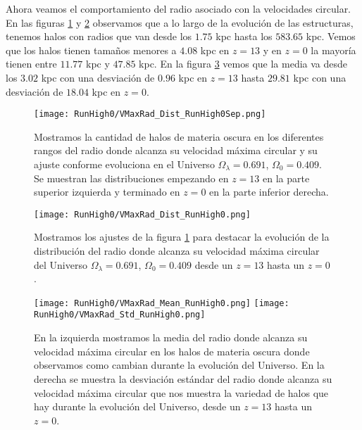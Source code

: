 Ahora veamos el comportamiento del radio asociado con la velocidades circular. En las figuras \ref{fig:High0-VMaxRadDistSep} y \ref{fig:High0-VMaxRadDist} observamos que a lo largo de la evolución de las estructuras, tenemos halos con radios que van desde los $1.75$ kpc hasta los $583.65$ kpc. Vemos que los halos tienen tamaños menores a $4.08$ kpc en $z=13$ y en $z=0$ la mayoría tienen entre $11.77$ kpc y $47.85$ kpc. En la figura \ref{fig:High0-VMaxRadStats} vemos que la media va desde los $3.02$ kpc con una desviación de $0.96$ kpc en $z=13$ hasta $29.81$ kpc con una desviación de $18.04$ kpc en $z=0$.

\begin{figure}[H]
    \centering
    \texttt{[image: RunHigh0/VMaxRad\_Dist\_RunHigh0Sep.png]}
    \caption[Radio donde se alcanza la velocidad máxima circular]{\footnotesize Mostramos la cantidad de halos de materia oscura en los diferentes rangos del radio donde alcanza su velocidad máxima circular y su ajuste conforme evoluciona en el Universo $\Omega_\lambda = 0.691$, $\Omega_0 = 0.409$. Se muestran las distribuciones empezando en $z=13$ en la parte superior izquierda y terminado en $z=0$ en la parte inferior derecha.}
    \label{fig:High0-VMaxRadDistSep}
\end{figure}

\begin{figure}[H]
    \centering
    \texttt{[image: RunHigh0/VMaxRad\_Dist\_RunHigh0.png]}
    \caption[Distribución del radio donde se alcanza la velocidad máxima circular]{\footnotesize Mostramos los ajustes de la figura \ref{fig:High0-VMaxRadDistSep} para destacar la evolución de la distribución del radio donde alcanza su velocidad máxima circular del Universo $\Omega_\lambda = 0.691$, $\Omega_0 = 0.409$ desde un $z=13$ hasta un $z=0$.}
    \label{fig:High0-VMaxRadDist}
\end{figure}

\begin{figure}[H]
    \centering
    \texttt{[image: RunHigh0/VMaxRad\_Mean\_RunHigh0.png]}
    \texttt{[image: RunHigh0/VMaxRad\_Std\_RunHigh0.png]}
    \caption[Media y desviación estándar del Radio donde se alcanza la velocidad máxima circular]{\footnotesize En la izquierda mostramos la media del radio donde alcanza su velocidad máxima circular en los halos de materia oscura donde observamos como cambian durante la evolución del Universo. En la derecha se muestra la desviación estándar del radio donde alcanza su velocidad máxima circular que nos muestra la variedad de halos que hay durante la evolución del Universo, desde un $z=13$ hasta un $z=0$.}
    \label{fig:High0-VMaxRadStats}
\end{figure}

